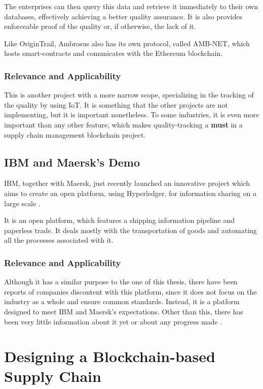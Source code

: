 The enterprises can then query this data and retrieve it immediately to their own databases, effectively achieving a better quality assurance. It is also provides enforceable proof of the quality or, if otherwise, the lack of it.

Like OriginTrail, Ambrosus also has its own protocol, called AMB-NET, which hosts smart-contracts and comunicates with the Ethereum blockchain.

\subsubsection{Relevance and Applicability}
This is another project with a more narrow scope, specializing in the tracking of the quality by using IoT. It is something that the other projects are not implementing, but it is important nonetheless. To some industries, it is even more important than any other feature, which makes quality-tracking a \textbf{must} in a supply chain management blockchain project.

\subsection{IBM and Maersk's Demo}
IBM, together with Maersk, just recently launched an innovative project which aims to create an open platform, using Hyperledger, for information sharing on a large scale \cite{A.P.MOLLER-MAERSK}.

It is an open platform, which features a shipping information pipeline and paperless trade. It deals mostly with the transportation of goods and automating all the processes associated with it. 

\subsubsection{Relevance and Applicability}

Although it has a similar purpose to the one of this thesis, there have been reports of companies discontent with this platform, since it does not focus on the industry as a whole and ensure common standards. Instead, it is a platform designed to meet IBM and Maersk's expectations. Other than this, there has been very little information about it yet or about any progress made \cite{Andersen2018}.

\section{Designing a Blockchain-based Supply Chain}

